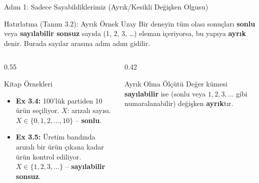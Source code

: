 \documentclass[light]{lutbeamer}
\begin{document}
\begin{frame}{Adım 1: Sadece Sayabildiklerimiz (Ayrık/Kesikli Değişken Olgusu)}
\begin{block}{Hatırlatma (Tanım 3.2): Ayrık Örnek Uzay}
  Bir deneyin tüm olası sonuçları \textbf{sonlu} veya \textbf{sayılabilir sonsuz} sayıda (1, 2, 3, \dots) eleman içeriyorsa, bu yapıya \textbf{ayrık} denir. Burada sayılar arasına adım adım gidilir.
\end{block}

\begin{columns}[T]
  \begin{column}{0.55\textwidth}
    \begin{exampleblock}{Kitap Örnekleri}
      \begin{itemize}
        \item \textbf{Ex 3.4:} 100'lük partiden 10 ürün seçiliyor. $X$: arızalı sayısı.
        $X \in \{0, 1, 2, \dots, 10\}$ -- \textbf{sonlu}.
        \item \textbf{Ex 3.5:} Üretim bandında arızalı bir ürün çıkana kadar ürün kontrol ediliyor.\\
        $X \in \{1, 2, 3, \dots\}$ -- \textbf{sayılabilir sonsuz}.
      \end{itemize}
    \end{exampleblock}
  \end{column}
  \begin{column}{0.42\textwidth}
    \begin{alertblock}{Ayrık Olma Ölçütü}
      Değer kümesi \textbf{sayılabilir} ise (sonlu veya $1, 2, 3, \dots$ gibi numaralanabilir) değişken \textbf{ayrık}tır.
    \end{alertblock}
  \end{column}
\end{columns}
\end{frame}
\end{document}
